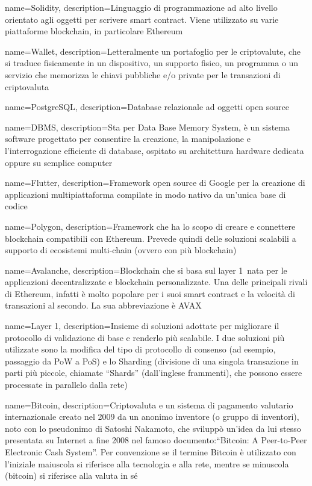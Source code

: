 {
	name={Solidity},
	description={Linguaggio di programmazione ad alto livello orientato agli oggetti per scrivere smart contract. Viene utilizzato su varie piattaforme blockchain, in particolare Ethereum}
}

{
	name={Wallet},
	description={Letteralmente un portafoglio per le criptovalute, che si traduce fisicamente in un dispositivo, un supporto fisico, un programma o un servizio che memorizza le chiavi pubbliche e/o private per le transazioni di criptovaluta}
}	

{
	name={PostgreSQL},
	description={Database relazionale ad oggetti open source}
}

{
	name={DBMS},
	description={Sta per Data Base Memory System, è un sistema software progettato per consentire la creazione, la manipolazione e l'interrogazione efficiente di database, ospitato su architettura hardware dedicata oppure su semplice computer}
}

{
	name={Flutter},
	description={Framework open source di Google per la creazione di applicazioni multipiattaforma compilate in modo nativo da un’unica base di codice}
}

{
	name={Polygon},
	description={Framework che ha lo scopo di creare e connettere blockchain compatibili con Ethereum. Prevede quindi delle soluzioni scalabili a supporto di ecosistemi multi-chain (ovvero con più blockchain)}
}

{
	name={Avalanche},
	description={Blockchain che si basa sul layer 1\glo\ nata per le applicazioni decentralizzate e blockchain personalizzate. Una delle principali rivali di Ethereum, infatti è molto popolare per i suoi smart contract e la velocità di transazioni al secondo. La sua abbreviazione è AVAX}
}

{
	name={Layer 1},
	description={Insieme di soluzioni adottate per migliorare il protocollo di validazione di base e renderlo più scalabile. I due soluzioni più utilizzate sono la modifica del tipo di protocollo di consenso (ad esempio, passaggio da PoW a PoS) e lo Sharding (divisione di una singola transazione in parti più piccole, chiamate “Shards” (dall’inglese frammenti), che possono essere processate in parallelo dalla rete)}
}

{
	name={Bitcoin},
	description={Criptovaluta e un sistema di pagamento valutario internazionale creato nel 2009 da un anonimo inventore (o gruppo di inventori), noto con lo pseudonimo di Satoshi Nakamoto, che sviluppò un'idea da lui stesso presentata su Internet a fine 2008 nel famoso documento:“Bitcoin: A Peer-to-Peer Electronic Cash System”. Per convenzione se il termine Bitcoin è utilizzato con l'iniziale maiuscola si riferisce alla tecnologia e alla rete, mentre se minuscola (bitcoin) si riferisce alla valuta in sé}
}

